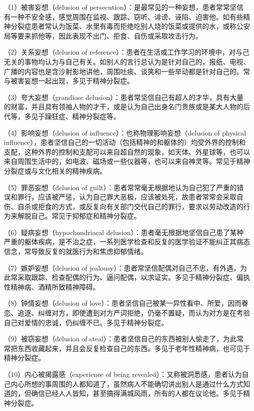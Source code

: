 （1）被害妄想（delusion of
persecution）：是最常见的一种妄想，患者常常坚信有一种不安全感，感觉周围在监视、跟踪、窃听、诽谤、诬陷、迫害他。如有些精神分裂症患者常认为饭菜、水里有毒而拒绝吃别人烧的饭菜或提供的水，或称公安局等要来抓他等，因此表现不出门、拒食、自伤或采取攻击行为。

（2）关系妄想（delusion of
reference）：患者在生活或工作学习的环境中，对与己无关的事物均认为与自己有关。如别人的言行总认为是针对自己的，报纸、电视、广播的内容也是含沙射影地讲他，周围吐痰、谈笑和一些举动都是针对自己的。常与被害妄想一起出现，多见于精神分裂症。

（3）夸大妄想（grandiose
delusion）：患者常坚信自己有超人的才华，具有大量的财富，并且具有领袖人物的才干，或是认为自己出身名门贵族或是某大人物的后代等，多见于躁狂症、精神分裂症等。

（4）影响妄想（delusion of influence）：也称物理影响妄想（delusion of
physical
influence），患者坚信自己的一切活动（包括精神的和躯体的）均受外界的控制和支配，这种外界的控制和支配可以来自超自然的现象，如天体、外星球等，也可以来自周围生活中的，如电波、磁场或一些仪器等，也可以来自神灵等。常见于精神分裂症或与文化相关的精神疾病。

（5）罪恶妄想（delusion of
guilt）：患者常常毫无根据地认为自己犯了严重的错误和罪行，应该被严惩，认为自己罪大恶极，应该被处死，故患者常常会采取自伤、自杀或拒食的方式，或反复向有关部门交代自己的罪行，要求以劳动改造的行为来解脱自己。常见于抑郁症和精神分裂症。

（6）疑病妄想（hypochondriacal
delusion）：患者毫无根据地坚信自己患了某种严重的躯体疾病，是不治之症，一系列医学检查和反复的医学验证不能纠正其病态信念，常导致反复的就医行为和焦虑抑郁情绪。

（7）嫉妒妄想（delusion of
jealousy）：患者常坚信配偶对自己不忠，有外遇，为此常采取跟踪、检查配偶的行为、逼问配偶，以求证实。多见于精神分裂症、偏执性精神病、酒精所致精神障碍。

（8）钟情妄想（delusion of
love）：患者坚信自己被某一异性看中、所爱，因而眷恋、追逐、纠缠对方，即使遭到对方严词拒绝，仍毫不置疑，而认为对方是在考验自己对爱情的忠诚，仍纠缠不已。多见于精神分裂症。

（9）被窃妄想（delusion of
steal）：患者坚信自己的东西被别人偷走了，为此常常把东西收藏起来，并且会反复检查自己的东西。多见于老年性精神病，也可见于精神分裂症。

（10）内心被揭露感（experience of being
revealed）：又称被洞悉感，患者认为自己内心所想的事周围的人都知道了，虽然病人不能确切讲出别人是通过什么方式知道的，但确信已经人人皆知，甚至搞得满城风雨，所有的人都在议论他。多见于精神分裂症。

